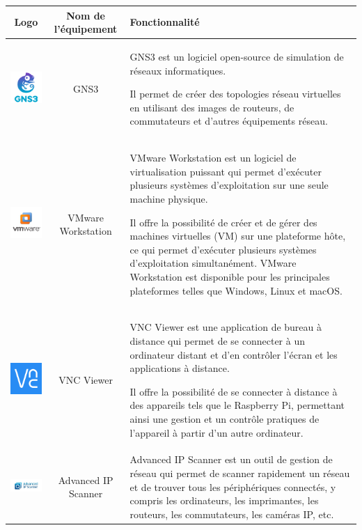 \begin{table}[H]
\begin{tabular}{|c{3cm}|c{3cm}|l{10cm}|}
\hline
\textbf{Logo}         & \textbf{Nom de l'équipement}   & \textbf{Fonctionnalité} \\
\hline
\includegraphics[width=3cm]{Images/Logo-GNS3.png} & GNS3 & GNS3 est un logiciel open-source de simulation de réseaux informatiques. 

Il permet de créer des topologies réseau virtuelles en utilisant des images de routeurs, de commutateurs et d'autres équipements réseau. \\
\hline
\includegraphics[width=3cm]{Images/Logo-VMWare.jpg}  & VMware Workstation & VMware Workstation est un logiciel de virtualisation puissant qui permet d'exécuter plusieurs systèmes d'exploitation sur une seule machine physique. 

Il offre la possibilité de créer et de gérer des machines virtuelles (VM) sur une plateforme hôte, ce qui permet d'exécuter plusieurs systèmes d'exploitation simultanément. VMware Workstation est disponible pour les principales plateformes telles que Windows, Linux et macOS. \\
\hline
\includegraphics[width=3cm]{Images/Logo-VNCViewer.png} & VNC Viewer & VNC Viewer est une application de bureau à distance qui permet de se connecter à un ordinateur distant et d'en contrôler l'écran et les applications à distance. 

Il offre la possibilité de se connecter à distance à des appareils tels que le Raspberry Pi, permettant ainsi une gestion et un contrôle pratiques de l'appareil à partir d'un autre ordinateur. \\
\hline
\includegraphics[width=3cm]{Images/Logo-IPScanner.png} & Advanced IP Scanner & Advanced IP Scanner est un outil de gestion de réseau qui permet de scanner rapidement un réseau et de trouver tous les périphériques connectés, y compris les ordinateurs, les imprimantes, les routeurs, les commutateurs, les caméras IP, etc.


\end{tabular}
\end{table}
